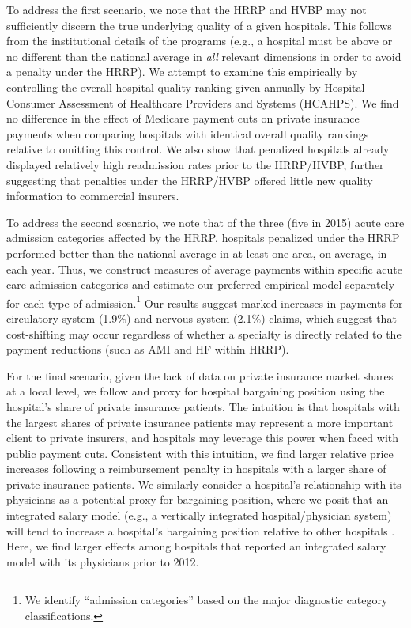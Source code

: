 \documentclass[12pt]{article}
\begin{document}
To address the first scenario, we note that the HRRP and HVBP may not sufficiently discern the true underlying quality of a given hospitals. This follows from the institutional details of the programs (e.g., a hospital must be above or no different than the national average in \textit{all} relevant dimensions in order to avoid a penalty under the HRRP). We attempt to examine this empirically by controlling the overall hospital quality ranking given annually by Hospital Consumer Assessment of Healthcare Providers and Systems (HCAHPS). We find no difference in the effect of Medicare payment cuts on private insurance payments when comparing hospitals with identical overall quality rankings relative to omitting this control. We also show that penalized hospitals already displayed relatively high readmission rates prior to the HRRP/HVBP, further suggesting that penalties under the HRRP/HVBP offered little new quality information to commercial insurers.

To address the second scenario, we note that of the three (five in 2015) acute care admission categories affected by the HRRP, hospitals penalized under the HRRP performed better than the national average in at least one area, on average, in each year.  Thus, we construct measures of average payments within specific acute care admission categories and estimate our preferred empirical model separately for each type of admission.\footnote{We identify ``admission categories'' based on the major diagnostic category classifications.}  Our results suggest marked increases in payments for circulatory system (1.9$\%$) and nervous system (2.1$\%$) claims, which suggest that cost-shifting may occur regardless of whether a specialty is directly related to the payment reductions (such as AMI and HF within HRRP).

For the final scenario, given the lack of data on private insurance market shares at a local level, we follow \cite{wu2010} and proxy for hospital bargaining position using the hospital's share of private insurance patients. The intuition is that hospitals with the largest shares of private insurance patients may represent a more important client to private insurers, and hospitals may leverage this power when faced with public payment cuts. Consistent with this intuition, we find larger relative price increases following a reimbursement penalty in hospitals with a larger share of private insurance patients. We similarly consider a hospital's relationship with its physicians as a potential proxy for bargaining position, where we posit that an integrated salary model (e.g., a vertically integrated hospital/physician system) will tend to increase a hospital's bargaining position relative to other hospitals \citep{lewis2015,mccarthy2017}. Here, we find larger effects among hospitals that reported an integrated salary model with its physicians prior to 2012.
\end{document}
